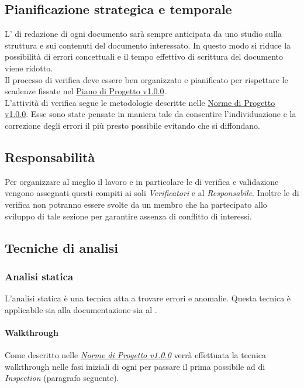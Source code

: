 \documentclass{scalatekids-article}
\begin{document}
\subsection{Pianificazione strategica e temporale}
L' di redazione di ogni documento sarà sempre anticipata da uno studio sulla struttura e sui contenuti del documento interessato. In questo modo si riduce la possibilità di errori concettuali e il tempo effettivo di scrittura del documento viene ridotto.\\
Il processo di verifica deve essere ben organizzato e pianificato per rispettare le scadenze fissate nel \href{run:./PianoDiProgetto\_v1.0.0.pdf}{Piano di Progetto v1.0.0}.\\
L'attività di verifica segue le metodologie descritte nelle \href{run:../Interni/NormeDiProgetto\_v1.0.0.pdf}{Norme di Progetto v1.0.0}. Esse sono state pensate in maniera tale da consentire l'individuazione e la correzione degli errori il più presto possibile evitando che si diffondano.
\subsection{Responsabilità}
Per organizzare al meglio il lavoro e in particolare le  di verifica e validazione vengono assegnati questi compiti ai soli \textit{Verificatori} e al \textit{Responsabile}. Inoltre le  di verifica non potranno essere svolte da un membro che ha partecipato allo sviluppo di tale sezione per garantire assenza di conflitto di interessi.
\subsection{Tecniche di analisi}
\label{sec:TecnicheDiAnalisi}
\subsubsection{Analisi statica}
L'analisi statica è una tecnica atta a trovare errori e anomalie. Questa tecnica è applicabile sia alla documentazione sia al .
\paragraph{Walkthrough}
\label{sec:walkthrough}Come descritto nelle \textit{\href{run:../Interni/NormeDiProgetto_v1.0.0.pdf}{Norme di Progetto v1.0.0}} verrà effettuata la tecnica walkthrough nelle fasi iniziali di ogni  per passare il prima possibile ad  di \textit{Inspection} (paragrafo seguente).
\end{document}
